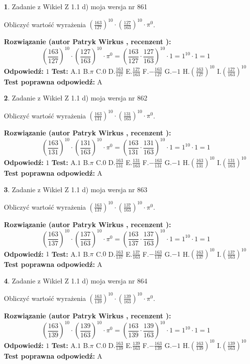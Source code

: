 \documentclass[12pt, a4paper]{article}
\theoremstyle{definition} %
\newtheorem{zad}{}
\newcommand{\zadStart}[1]{\begin{zad}#1\newline}
\newcommand{\zadStop}{\end{zad}}
\newcommand{\rozwStart}[2]{\noindent \textbf{Rozwiązanie (autor #1 , recenzent #2): }\newline}
\newcommand{\rozwStop}{\newline}
\newcommand{\odpStart}{\noindent \textbf{Odpowiedź:}\newline}
\newcommand{\odpStop}{\newline}
\newcommand{\testStart}{\noindent \textbf{Test:}\newline}
\newcommand{\testStop}{\newline}
\newcommand{\kluczStart}{\noindent \textbf{Test poprawna odpowiedź:}\newline}
\newcommand{\kluczStop}{\newline}
\begin{document}
\zadStart{Zadanie z Wikieł Z 1.1 d) moja wersja nr 861}

Obliczyć wartość wyrażenia $(\frac{163}{127})^{10} \cdot (\frac{127}{163})^{10} \cdot \pi^{0}$.
\zadStop
\rozwStart{Patryk Wirkus}{}
$$(\frac{163}{127})^{10} \cdot (\frac{127}{163})^{10} \cdot \pi^{0} = (\frac{163}{127} \cdot \frac{127}{163})^{10} \cdot 1 = 1^{10} \cdot 1 = 1$$
\rozwStop
\odpStart
$1$
\odpStop
\testStart
A.$1$ B.$\pi$ C.$0$ D.$\frac{163}{127}$ E.$\frac{127}{163}$
F.$-\frac{163}{127}$ G.$-1$
H.$(\frac{163}{127})^{10}$
I.$(\frac{127}{163})^{10}$
\testStop
\kluczStart
A
\kluczStop



\zadStart{Zadanie z Wikieł Z 1.1 d) moja wersja nr 862}

Obliczyć wartość wyrażenia $(\frac{163}{131})^{10} \cdot (\frac{131}{163})^{10} \cdot \pi^{0}$.
\zadStop
\rozwStart{Patryk Wirkus}{}
$$(\frac{163}{131})^{10} \cdot (\frac{131}{163})^{10} \cdot \pi^{0} = (\frac{163}{131} \cdot \frac{131}{163})^{10} \cdot 1 = 1^{10} \cdot 1 = 1$$
\rozwStop
\odpStart
$1$
\odpStop
\testStart
A.$1$ B.$\pi$ C.$0$ D.$\frac{163}{131}$ E.$\frac{131}{163}$
F.$-\frac{163}{131}$ G.$-1$
H.$(\frac{163}{131})^{10}$
I.$(\frac{131}{163})^{10}$
\testStop
\kluczStart
A
\kluczStop



\zadStart{Zadanie z Wikieł Z 1.1 d) moja wersja nr 863}

Obliczyć wartość wyrażenia $(\frac{163}{137})^{10} \cdot (\frac{137}{163})^{10} \cdot \pi^{0}$.
\zadStop
\rozwStart{Patryk Wirkus}{}
$$(\frac{163}{137})^{10} \cdot (\frac{137}{163})^{10} \cdot \pi^{0} = (\frac{163}{137} \cdot \frac{137}{163})^{10} \cdot 1 = 1^{10} \cdot 1 = 1$$
\rozwStop
\odpStart
$1$
\odpStop
\testStart
A.$1$ B.$\pi$ C.$0$ D.$\frac{163}{137}$ E.$\frac{137}{163}$
F.$-\frac{163}{137}$ G.$-1$
H.$(\frac{163}{137})^{10}$
I.$(\frac{137}{163})^{10}$
\testStop
\kluczStart
A
\kluczStop



\zadStart{Zadanie z Wikieł Z 1.1 d) moja wersja nr 864}

Obliczyć wartość wyrażenia $(\frac{163}{139})^{10} \cdot (\frac{139}{163})^{10} \cdot \pi^{0}$.
\zadStop
\rozwStart{Patryk Wirkus}{}
$$(\frac{163}{139})^{10} \cdot (\frac{139}{163})^{10} \cdot \pi^{0} = (\frac{163}{139} \cdot \frac{139}{163})^{10} \cdot 1 = 1^{10} \cdot 1 = 1$$
\rozwStop
\odpStart
$1$
\odpStop
\testStart
A.$1$ B.$\pi$ C.$0$ D.$\frac{163}{139}$ E.$\frac{139}{163}$
F.$-\frac{163}{139}$ G.$-1$
H.$(\frac{163}{139})^{10}$
I.$(\frac{139}{163})^{10}$
\testStop
\kluczStart
A
\kluczStop
\end{document}
